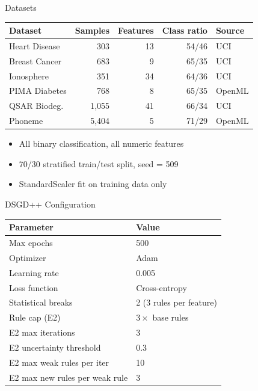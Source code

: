 \documentclass[aspectratio=169,12pt]{beamer}
\begin{document}
\begin{frame}{Datasets}

\begin{table}
\centering
\begin{tabular}{lrrrl}
\toprule
\textbf{Dataset} & \textbf{Samples} & \textbf{Features} & \textbf{Class ratio} & \textbf{Source} \\
\midrule
Heart Disease      & 303   & 13 & 54/46 & UCI \\
Breast Cancer      & 683   & 9  & 65/35 & UCI \\
Ionosphere         & 351   & 34 & 64/36 & UCI \\
PIMA Diabetes      & 768   & 8  & 65/35 & OpenML \\
QSAR Biodeg.       & 1{,}055 & 41 & 66/34 & UCI \\
Phoneme            & 5{,}404 & 5  & 71/29 & OpenML \\
\bottomrule
\end{tabular}
\end{table}

\vspace{1em}
\begin{itemize}
    \item All binary classification, all numeric features
    \item 70/30 stratified train/test split, seed = 509
    \item StandardScaler fit on training data only
\end{itemize}

\end{frame}

\begin{frame}{DSGD++ Configuration}

\begin{table}
\centering
\begin{tabular}{ll}
\toprule
\textbf{Parameter} & \textbf{Value} \\
\midrule
Max epochs & 500 \\
Optimizer & Adam \\
Learning rate & 0.005 \\
Loss function & Cross-entropy \\
Statistical breaks & 2 (3 rules per feature) \\
Rule cap (E2) & $3\times$ base rules \\
E2 max iterations & 3 \\
E2 uncertainty threshold & 0.3 \\
E2 max weak rules per iter & 10 \\
E2 max new rules per weak rule & 3 \\
\bottomrule
\end{tabular}
\end{table}

\end{frame}
\end{document}
